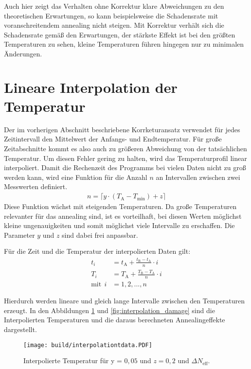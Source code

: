 Auch hier zeigt das Verhalten ohne Korrektur klare Abweichungen zu den theoretischen
Erwartungen, so kann beispielsweise die Schadensrate mit voranschreitendem annealing nicht steigen.
Mit Korrektur verhält sich die Schadensrate gemäß den Erwartungen, der stärkste
Effekt ist bei den größten Temperaturen zu sehen, kleine Temperaturen führen hingegen
nur zu minimalen Änderungen.



\section{Lineare Interpolation der Temperatur}
Der im vorherigen Abschnitt beschriebene Korrketuransatz verwendet für jedes
Zeitintervall den Mittelwert der Anfangs- und Endtemperatur. Für große
Zeitabschnitte kommt es also auch zu größeren Abweichung von der tatsächlichen
Temperatur. Um diesen Fehler gering zu halten, wird das Temperaturprofil
linear interpoliert.
Damit die Rechenzeit des Programms bei vielen Daten nicht zu groß werden
kann, wird eine Funktion für die Anzahl $n$ an Intervallen zwischen zwei
Messwerten definiert.
\begin{align*}
  n = \lceil{y \cdot (T_{\mathrm{A}}-T_{\mathrm{min}})+ z}\rceil \label{eqn:intervall}
\end{align*}
Diese Funktion wächst mit steigenden Temperaturen.
Da große Temperaturen relevanter für das annealing sind, ist es vorteilhaft,
bei diesen Werten möglichst kleine ungenauigkeiten und somit möglichst viele
Intervalle zu erschaffen. Die Parameter $y$ und $z$ sind dabei frei anpassbar.

Für die Zeit und die Temperatur der interpolierten Daten gilt:
\begin{align}
  t_i &= t_{\mathrm{A}} +  \frac{t_{\mathrm{B}}-t_{\mathrm{A}}}{n} \cdot i \\
  T_i &= T_{\mathrm{A}} +  \frac{T_{\mathrm{B}}-T_{\mathrm{A}}}{n} \cdot i \\
  \text{mit}\:\:i &= 1, 2, ..., n
\end{align}

Hierdurch werden lineare und gleich lange Intervalle zwischen den Temperaturen
erzeugt. In den Abbildungen \ref{fig:interpolation_N_eff} und \ref{fig:interpolation_damage} sind die Interpolierten Temperaturen und
die daraus berechneten Annealingeffekte dargestellt.

\begin{figure}
    \texttt{[image: build/interpolationtdata.PDF]}
\caption{Interpolierte Temperatur für y = $0,05$ und $z=0,2$ und $\Delta N_{\mathrm{eff}}$.}
\label{fig:interpolation_N_eff}
\end{figure}



